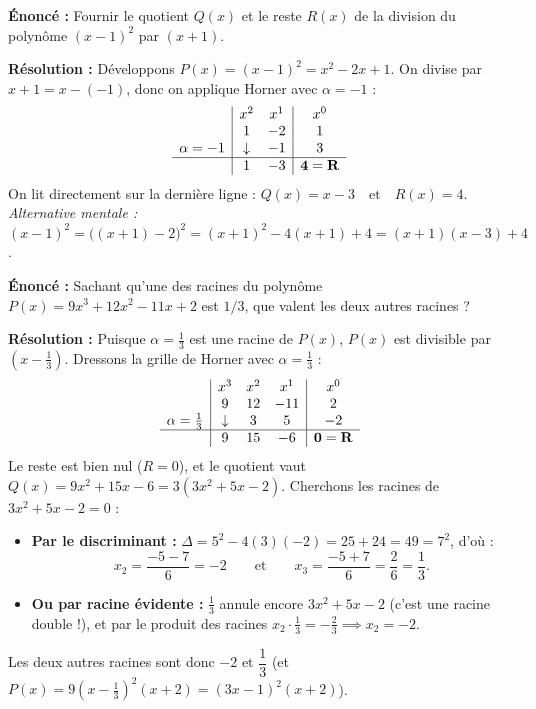 \begin{exemple}
\textbf{Énoncé :} Fournir le quotient $Q(x)$ et le reste $R(x)$ de la division du polynôme $(x - 1)^2$ par $(x + 1)$.

\textbf{Résolution :} Développons $P(x) = (x - 1)^2 = x^2 - 2x + 1$. On divise par $x + 1 = x - (-1)$, donc on applique Horner avec $\alpha = -1$ :
\[
\begin{array}{c|cc|c}
    & x^2 & x^1 & x^0 \\
    & 1 & -2 & 1 \\
    \alpha = -1 & \downarrow & -1 & 3 \\
    \hline
    & 1 & -3 & \mathbf{4 = R}
\end{array}
\]
On lit directement sur la dernière ligne : $\boxed{Q(x) = x - 3 \quad \text{et} \quad R(x) = 4}$.
\emph{Alternative mentale :} $(x - 1)^2 = \bigl((x + 1) - 2\bigr)^2 = (x + 1)^2 - 4(x + 1) + 4 = (x + 1)(x - 3) + 4$.
\end{exemple}

\begin{exemple}
\textbf{Énoncé :} Sachant qu'une des racines du polynôme $P(x) = 9x^3 + 12x^2 - 11x + 2$ est $1/3$, que valent les deux autres racines ?

\textbf{Résolution :} Puisque $\alpha = \frac{1}{3}$ est une racine de $P(x)$, $P(x)$ est divisible par $\left(x - \frac{1}{3}\right)$. Dressons la grille de Horner avec $\alpha = \frac{1}{3}$ :
\[
\begin{array}{c|ccc|c}
    & x^3 & x^2 & x^1 & x^0 \\
    & 9 & 12 & -11 & 2 \\
    \alpha = \tfrac{1}{3} & \downarrow & 3 & 5 & -2 \\
    \hline
    & 9 & 15 & -6 & \mathbf{0 = R}
\end{array}
\]
Le reste est bien nul ($R = 0$), et le quotient vaut $Q(x) = 9x^2 + 15x - 6 = 3(3x^2 + 5x - 2)$.
Cherchons les racines de $3x^2 + 5x - 2 = 0$ :
\begin{itemize}
    \item \textbf{Par le discriminant :} $\Delta = 5^2 - 4(3)(-2) = 25 + 24 = 49 = 7^2$, d'où :
    \[
        x_2 = \frac{-5 - 7}{6} = -2 \qquad \text{et} \qquad x_3 = \frac{-5 + 7}{6} = \frac{2}{6} = \frac{1}{3}.
    \]
    \item \textbf{Ou par racine évidente :} $\frac{1}{3}$ annule encore $3x^2 + 5x - 2$ (c'est une racine double !), et par le produit des racines $x_2 \cdot \frac{1}{3} = -\frac{2}{3} \implies x_2 = -2$.
\end{itemize}
Les deux autres racines sont donc $\boxed{-2 \text{ et } \dfrac{1}{3}}$ (et $P(x) = 9\left(x - \frac{1}{3}\right)^2(x + 2) = (3x - 1)^2(x + 2)$).
\end{exemple}

